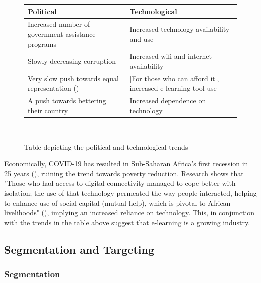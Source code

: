 \documentclass[letterpaper]{article}
\begin{document}
            \begin{figure}[h!]
                \begin{center}
                    \begin{tabular}{| p{7.5cm} | p{7.5cm} |}
                        \hline
                        Political & Technological\\
                        \hline
                        Increased number of government assistance programs &
                            Increased technology availability and use \\
                        Slowly decreasing corruption & 
                            Increased wifi and internet availability \\
                        \raggedright Very slow push towards equal representation (\cite{trends-politics-women}) & 
                            [For those who can afford it], increased e-learning tool use \\
                        A push towards bettering their country & Increased dependence on technology \\
                        \hline
                    \end{tabular} \\
                    \caption{Table depicting the political and technological trends}
                \end{center}
            \end{figure}

            Economically, COVID-19 has resulted in Sub-Saharan Africa's first recession in 25 years (\cite{trends-economical-covid}), ruining the trend towards poverty reduction. Research shows that "Those who had access to digital connectivity managed to cope better with isolation; the use of that technology permeated the way people interacted, helping to enhance use of social capital (mutual help), which is pivotal to African livelihoods" (\cite{trends-economical-covid}), implying an increased reliance on technology. This, in conjunction with the trends in the table above suggest that e-learning is a growing industry.

    \subsection{Segmentation and Targeting}

        \subsubsection{Segmentation}
\end{document}

